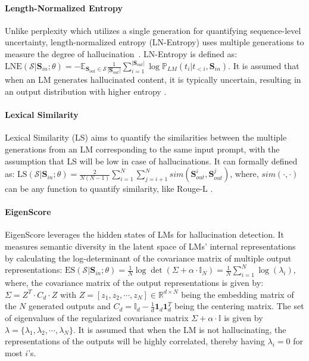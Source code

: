 \paragraph{\textbf{Length-Normalized Entropy}} Unlike perplexity which utilizes a single generation for quantifying sequence-level uncertainty, length-normalized entropy (LN-Entropy) uses multiple generations to measure the degree of hallucination~\citep{malinin_uncertainty_2021}. LN-Entropy is defined as: $\text{LNE}(\mathcal{S}|\mathbf{S}_{in}; \theta) = -\mathbb{E}_{\mathbf{S}_{out}\in \mathcal{S}}\frac{1}{|\mathbf{S}_{out}|}\sum_{i=1}^{|\mathbf{S}_{out}|}\log \mathbb{P}_{LM}(t_i|t_{<i}, \mathbf{S}_{in})$. It is assumed that when an LM generates hallucinated content, it is typically uncertain, resulting in an output distribution with higher entropy \cite{kadavath2022languagemodelsmostlyknow}.

\paragraph{\textbf{Lexical Similarity}} Lexical Similarity (LS) \cite{lin_towards_2022} aims to quantify the similarities between the multiple generations from an LM corresponding to the same input prompt, with the assumption that LS will be low in case of hallucinations. It can formally defined as: 
$\text{LS}(\mathcal{S}|\mathbf{S}_{in}; \theta) = \frac{2}{N(N-1)}\sum_{i=1}^{N}\sum_{j=i+1}^{N}sim(\mathbf{S}_{out}^i, \mathbf{S}_{out}^j)$, where, $sim(\cdot, \cdot)$ can be any function to quantify similarity, like Rouge-L \cite{lin-2004-rouge}.

\paragraph{\textbf{EigenScore}}
EigenScore \citep{chen_inside:_2024} leverages the hidden states of LMs for hallucination detection. It measures semantic diversity in the latent space of LMs' internal representations by calculating the log-determinant of the covariance matrix of multiple output representations: $\text{ES}(\mathcal{S}|\mathbf{S}_{in}; \theta)  = \frac{1}{N}\log\det(\Sigma + \alpha \cdot \mathbb{I}_N) = \frac{1}{N}\sum_{i=1}^{N}\log(\lambda_i)$, where, the covariance matrix of the output representations is given by: $\Sigma = Z^T \cdot C_d \cdot Z$ with $Z = [z_1, z_2, \cdots, z_N] \in \mathbb{R}^{d\times N}$ being the embedding matrix of the $N$ generated outputs and $C_d = \mathbb{I}_d - \frac{1}{d}\mathbf{1}_d\mathbf{1}_d^T$ being the centering matrix. The set of eigenvalues of the regularized covariance matrix $\Sigma + \alpha \cdot \mathbb{I}$ is given by $\lambda = \{\lambda_1, \lambda_2, \cdots, \lambda_N\}$. It is assumed that when the LM is not hallucinating, the representations of the outputs will be highly correlated, thereby having $\lambda_i=0$ for most $i$'s.


